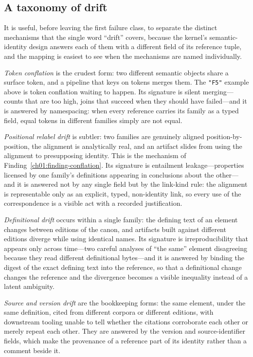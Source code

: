 \subsection{A taxonomy of drift}\label{ch01:taxonomy}

It is useful, before leaving the first failure class, to separate the
distinct mechanisms that the single word ``drift'' covers, because the
kernel's semantic-identity design answers each of them with a different
field of its reference tuple, and the mapping is easiest to see when the
mechanisms are named individually.

\emph{Token conflation} is the crudest form: two different semantic
objects share a surface token, and a pipeline that keys on tokens merges
them. The \texttt{"F5"} example above is token conflation waiting to
happen. Its signature is silent merging---counts that are too high,
joins that succeed when they should have failed---and it is answered by
namespacing: when every reference carries its family as a typed field,
equal tokens in different families simply are not equal.

\emph{Positional relabel drift} is subtler: two families are genuinely
aligned position-by-position, the alignment is analytically real, and an
artifact slides from using the alignment to presupposing identity. This
is the mechanism of Finding~\ref{ch01:finding-conflation}. Its signature
is entailment leakage---properties licensed by one family's definitions
appearing in conclusions about the other---and it is answered not by any
single field but by the link-kind rule: the alignment is representable
only as an explicit, typed, non-identity link, so every use of the
correspondence is a visible act with a recorded justification.

\emph{Definitional drift} occurs within a single family: the defining
text of an element changes between editions of the canon, and artifacts
built against different editions diverge while using identical names.
Its signature is irreproducibility that appears only across time---two
careful analyses of ``the same'' element disagreeing because they read
different definitional bytes---and it is answered by binding the digest
of the exact defining text into the reference, so that a definitional
change changes the reference and the divergence becomes a visible
inequality instead of a latent ambiguity.

\emph{Source and version drift} are the bookkeeping forms: the same
element, under the same definition, cited from different corpora or
different editions, with downstream tooling unable to tell whether the
citations corroborate each other or merely repeat each other. They are
answered by the version and source-identifier fields, which make the
provenance of a reference part of its identity rather than a comment
beside it.

